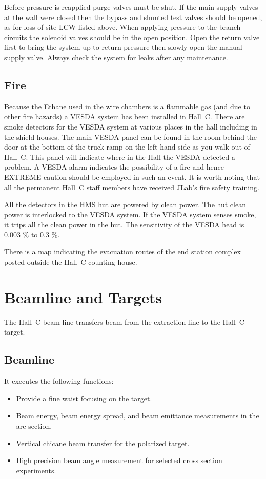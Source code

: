 Before pressure is reapplied purge valves must be shut.  If the main
supply valves at the wall were closed then the bypass and shunted test
valves should be opened, as for loss of site LCW listed above.  When
applying pressure to the branch circuits the solenoid valves should be
in the open position.  Open the return valve first to bring the system
up to return pressure then slowly open the manual supply valve.  Always
check the system for leaks after any maintenance.


\subsection{Fire}

Because the Ethane used in the wire chambers is a flammable gas
(and due to other fire hazards) a VESDA
system has been installed in Hall~C. There are smoke detectors
for the VESDA system at various places in the hall including in the shield
houses.
The main VESDA panel can be found in the room behind the door at the bottom
of the truck ramp on the left hand side as you walk out of Hall~C. This
panel will indicate where in the Hall the VESDA detected a problem.
A VESDA alarm indicates the possibility of a fire and hence EXTREME caution
should be employed in such an event. It is worth noting that all the
permanent Hall~C staff members have received JLab's fire safety training.

All the detectors in the HMS hut are powered by clean power. The
hut clean power is interlocked to the VESDA system. If the VESDA system
senses smoke, it trips all the clean power in the hut. The sensitivity of the
VESDA head is 0.003 \% to 0.3 \%.

There is a map indicating the evacuation routes of the end station complex
posted outside the Hall~C counting house.

\section{Beamline and Targets}

The Hall~C beam line transfers beam from the extraction line to the Hall~C target.

\subsection{Beamline}

It executes the following functions:

\begin{itemize}
\item{Provide a fine waist focusing on the target.}
\item{Beam energy, beam energy spread, and beam emittance measurements
in the arc section.}
\item{Vertical chicane beam transfer for the polarized target.}

\item{High precision beam angle measurement for selected cross section
experiments.}
\end{itemize}

